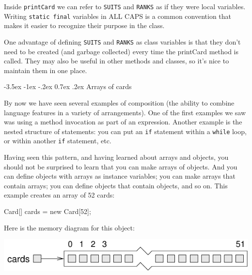\documentclass[12pt]{book}
\makeatletter
\theoremstyle{exercise}
\newcommand{\java}[1]{\verb"#1"}
\renewcommand{\section}{\@startsection {section}{1}{\z@}%
    {-3.5ex \@plus -1ex \@minus -.2ex}%
    {0.7ex \@plus.2ex}%
    {\normalfont\Large\bfseries}}
\newcommand{\java}[1]{\lstinline{#1}} %
\makeatother
\begin{document}
Inside \java{printCard} we can refer to \java{SUITS} and \java{RANKS} as if they were local variables.
Writing \java{static final} variables in ALL CAPS is a common convention that makes it easier to recognize their purpose in the class.

One advantage of defining \java{SUITS} and \java{RANKS} as class variables is that they don't need to be created (and garbage collected) every time the printCard method is called.
They may also be useful in other methods and classes, so it's nice to maintain them in one place.


\section{Arrays of cards}
\label{cardarray}



By now we have seen several examples of composition (the ability to combine language features in a variety of arrangements).
One of the first examples we saw was using a method invocation as part of an expression.
Another example is the nested structure of statements: you can put an \java{if} statement within a \java{while} loop, or within
another \java{if} statement, etc.

Having seen this pattern, and having learned about arrays and objects, you should not be surprised to learn that you can make arrays of objects.
And you can define objects with arrays as instance variables; you can make arrays that contain arrays; you can define objects that contain objects, and so on.
This example creates an array of 52 cards:

\begin{code}
    Card[] cards = new Card[52];
\end{code}


Here is the memory diagram for this object:

\begin{center}
\includegraphics{figs/cardarray.pdf}
\end{center}
\end{document}

